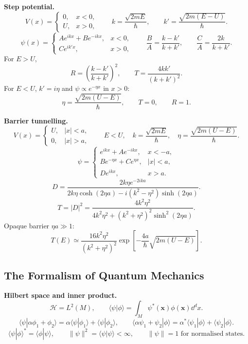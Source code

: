 \noindent\textbf{Step potential.}
\[
V(x)=\begin{cases}0,&x<0,\\ U,&x>0,\end{cases}\qquad
k=\frac{\sqrt{2mE}}{\hbar},\qquad
k'=\frac{\sqrt{2m(E-U)}}{\hbar}.
\]
\[
\psi(x)=\begin{cases}
Ae^{ikx}+Be^{-ikx},&x<0,\\
Ce^{ik'x},&x>0,
\end{cases}
\qquad
\frac{B}{A}=\frac{k-k'}{k+k'},\qquad
\frac{C}{A}=\frac{2k}{k+k'}.
\]
For \(E>U\),
\[
\boxed{R=\left(\frac{k-k'}{k+k'}\right)^2},\qquad
\boxed{T=\frac{4kk'}{(k+k')^2}}.
\]
For \(E<U\), \(k'=i\eta\) and \(\psi\propto e^{-\eta x}\) in \(x>0\):
\[
\eta=\frac{\sqrt{2m(U-E)}}{\hbar},\qquad T=0,\qquad R=1.
\]

\noindent\textbf{Barrier tunnelling.}
\[
V(x)=\begin{cases}U,&|x|<a,\\0,&|x|>a,\end{cases}\qquad
E<U,\quad
k=\frac{\sqrt{2mE}}{\hbar},\quad
\eta=\frac{\sqrt{2m(U-E)}}{\hbar}.
\]
\[
\psi=\begin{cases}
e^{ikx}+Ae^{-ikx},&x<-a,\\
Be^{-\eta x}+Ce^{\eta x},&|x|<a,\\
De^{ikx},&x>a.
\end{cases}
\]
\[
D=\frac{2k\eta e^{-2ika}}
{2k\eta\cosh(2\eta a)-i(k^2-\eta^2)\sinh(2\eta a)}.
\]
\[
\boxed{
T=|D|^2=
\frac{4k^2\eta^2}
{4k^2\eta^2+(k^2+\eta^2)^2\sinh^2(2\eta a)}
}.
\]
Opaque barrier \(\eta a\gg1\):
\[
T(E)\simeq
\frac{16k^2\eta^2}{(k^2+\eta^2)^2}
\exp\!\left[-\frac{4a}{\hbar}\sqrt{2m(U-E)}\right].
\]

\subsection{The Formalism of Quantum Mechanics}

\noindent\textbf{Hilbert space and inner product.}
\[
\mathcal{H}=L^2(M),\qquad
\langle\psi|\phi\rangle=\int_M \psi^*(\mathbf{x})\phi(\mathbf{x})\dd^d x.
\]
\[
\langle\psi|\alpha\phi_1+\phi_2\rangle
=\alpha\langle\psi|\phi_1\rangle+\langle\psi|\phi_2\rangle,\qquad
\langle\alpha\psi_1+\psi_2|\phi\rangle
=\alpha^*\langle\psi_1|\phi\rangle+\langle\psi_2|\phi\rangle.
\]
\[
\langle\psi|\phi\rangle^*=\langle\phi|\psi\rangle,\qquad
\|\psi\|^2=\langle\psi|\psi\rangle<\infty,\qquad
\|\psi\|=1\text{ for normalised states}.
\]

